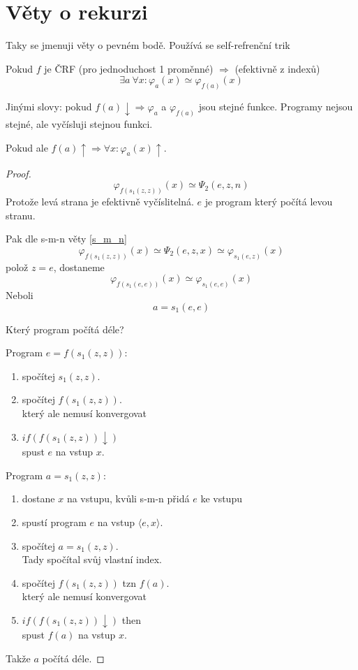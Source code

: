 \section{\texorpdfstring{Věty o rekurzi}{Věty o rekurzi}}
\vspace{5mm}
\large

Taky se jmenuji věty o pevném bodě. Používá se self-refrenční trik

\begin{theorem}[O rekurzi 1]\label{rek_1}
	Pokud $f$ je ČRF (pro jednoduchost 1 proměnné) $\Rightarrow$ (efektivně z indexů)
	\[ \exists a\ \forall x: \varphi_a(x) \simeq \varphi_{f(a)} (x) \]

	Jinými slovy: pokud $f(a) \downarrow \Rightarrow \varphi_a$ a $\varphi_{f(a)}$ jsou stejné funkce.
	Programy nejsou stejné, ale vyčísluji stejnou funkci.

	Pokud ale $f(a) \uparrow \Rightarrow \forall x: \varphi_a(x) \uparrow$.
\end{theorem}
\begin{proof}
	\[ \varphi_{f(s_1(z, z))} (x) \simeq \Psi_2(e, z, n) \]
	Protože levá strana je efektivně vyčíslitelná. $e$ je program který počítá levou stranu.

	Pak dle s-m-n věty \cref{s_m_n}
	\[ \varphi_{f(s_1(z, z))} (x) \simeq \Psi_2(e, z, x) \simeq \varphi_{s_1(e, z)} (x) \]
	polož $z = e$, dostaneme
	\[ \varphi_{f(s_1(e, e))} (x) \simeq \varphi_{s_1(e, e)} (x) \]
	Neboli
	\[ a = s_1(e, e) \]


	Který program počítá déle?

	Program $e = f(s_1(z, z))$:
	\begin{enumerate}
		\item spočítej $s_1(z, z)$.
		\item spočítej $f(s_1(z, z))$.\\
			který ale nemusí konvergovat
		\item $if(f(s_1(z, z)) \downarrow)$\\
			spust $e$ na vstup $x$.
	\end{enumerate}

	Program $a = s_1(z, z)$:
	\begin{enumerate}
		\item dostane $x$ na vstupu, kvůli s-m-n přidá $e$ ke vstupu
		\item spustí program $e$ na vstup $\langle e, x \rangle$.
		\item spočítej $a = s_1(z, z)$.\\
			Tady spočítal svůj vlastní index.
		\item spočítej $f(s_1(z, z))$ tzn $f(a)$.\\
			který ale nemusí konvergovat
		\item $if(f(s_1(z, z)) \downarrow)$ then \\
			spust $f(a)$ na vstup $x$.
	\end{enumerate}

	Takže $a$ počítá déle.
\end{proof}

